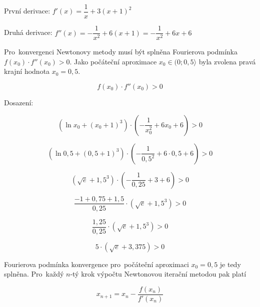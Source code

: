 \documentclass[a4paper,10pt]{article}
\begin{document}
\par První derivace: $f'\left(x\right)=\dfrac{1}{x}+3(x+1)^{2}$

\par Druhá derivace: $f''\left(x\right)=-\dfrac{1}{x^{2}}+6(x+1)=-\dfrac{1}{x^{2}}+6x+6$\\

\par Pro~konvergenci Newtonovy metody musí být splněna Fourierova podmínka
$f(x_0){\cdot}f''(x_0)>0$. Jako počáteční aproximace $x_0 \in (0; 0,5\rangle$ byla zvolena
pravá krajní hodnota $x_0=0,5$.

\begin{equation} 
f\left(x_0\right){\cdot}f''\left(x_0\right)>0
\end{equation}

\par Dosazení:

\begin{equation} 
\left(\ln{x_0}+(x_0+1)^{3}\right){\cdot}\left(-\dfrac{1}{x_0^{2}}+6x_{0}+6\right)>0
\end{equation}

\begin{equation} 
\left(\ln{0,5}+(0,5+1)^{3}\right){\cdot}\left(-\dfrac{1}{0,5^{2}}+6{\cdot}0,5+6\right)>0
\end{equation}

\begin{equation} 
\left(\sqrt{e}+1,5^3\right){\cdot}\left(-\dfrac{1}{0,25}+3+6\right)>0
\end{equation}

\begin{equation} 
\frac{-1+0,75+1,5}{0,25}{\cdot}\left(\sqrt{e}+1,5^3\right)>0
\end{equation}

\begin{equation} 
\frac{1,25}{0,25}{\cdot}\left(\sqrt{e}+1,5^3\right)>0
\end{equation}

\begin{equation} 
5{\cdot}(\sqrt{e}+3,375)>0
\end{equation}

\par Fourierova podmínka konvergence pro~počáteční aproximaci $x_0=0,5$ je tedy splněna.
Pro~každý $n$-tý krok výpočtu Newtonovou iterační metodou pak platí

\begin{equation}
x_{n+1}=x_n-\dfrac{f(x_n)}{f'(x_n)}
\end{equation}
\end{document}
